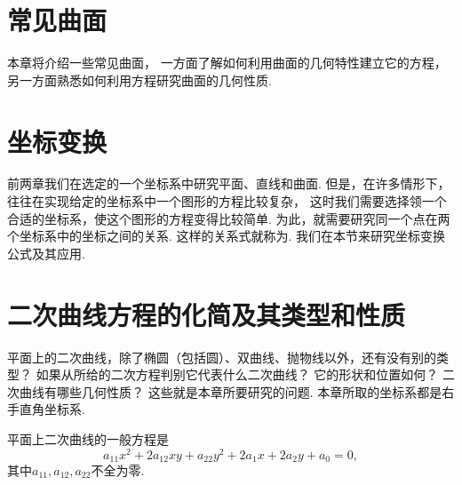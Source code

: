 \chapter{常见曲面}
本章将介绍一些常见曲面，
一方面了解如何利用曲面的几何特性建立它的方程，
另一方面熟悉如何利用方程研究曲面的几何性质.







\chapter{坐标变换}
前两章我们在选定的一个坐标系中研究平面、直线和曲面.
但是，在许多情形下，往往在实现给定的坐标系中一个图形的方程比较复杂，
这时我们需要选择领一个合适的坐标系，使这个图形的方程变得比较简单.
为此，就需要研究同一个点在两个坐标系中的坐标之间的关系.
这样的关系式就称为.
我们在本节来研究坐标变换公式及其应用.







\chapter{二次曲线方程的化简及其类型和性质}
\begingroup
平面上的二次曲线，除了椭圆（包括圆）、双曲线、抛物线以外，还有没有别的类型？
如果从所给的二次方程判别它代表什么二次曲线？
它的形状和位置如何？
二次曲线有哪些几何性质？
这些就是本章所要研究的问题.
本章所取的坐标系都是右手直角坐标系.

平面上二次曲线的一般方程是\begin{equation}\label{equation:二次曲线方程.平面二次曲线的一般方程}
	a_{11} x^2 + 2 a_{12} x y + a_{22} y^2
	+ 2 a_1 x + 2 a_2 y + a_0 = 0,
\end{equation}
其中\(a_{11},a_{12},a_{22}\)不全为零.

